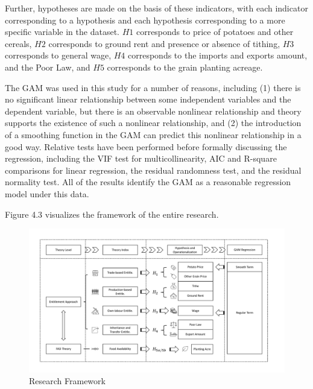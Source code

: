 Further, hypotheses are made on the basis of these indicators, with each indicator corresponding to a hypothesis and each hypothesis corresponding to a more specific variable in the dataset. $H1$ corresponds to price of potatoes and other cereals, $H2$ corresponds to ground rent and presence or absence of tithing, $H3$ corresponds to general wage, $H4$ corresponds to the imports and exports amount, and the Poor Law, and $H5$ corresponds to the grain planting acreage.

The GAM was used in this study for a number of reasons, including (1) there is no significant linear relationship between some independent variables and the dependent variable, but there is an observable nonlinear relationship and theory supports the existence of such a nonlinear relationship, and (2) the introduction of a smoothing function in the GAM can predict this nonlinear relationship in a good way. Relative tests have been performed before formally discussing the regression, including the VIF test for multicollinearity, AIC and R-square comparisons for linear regression, the residual randomness test, and the residual normality test. All of the results identify the GAM as a reasonable regression model under this data.

Figure 4.3 visualizes the framework of the entire research.

\begin{landscape}
    \begin{figure}[h]
        \centering
        \caption{Research Framework}
        \includegraphics[width=1.5\textheight]{../03_outputs/Framework.pdf}
    \end{figure}
\end{landscape}





